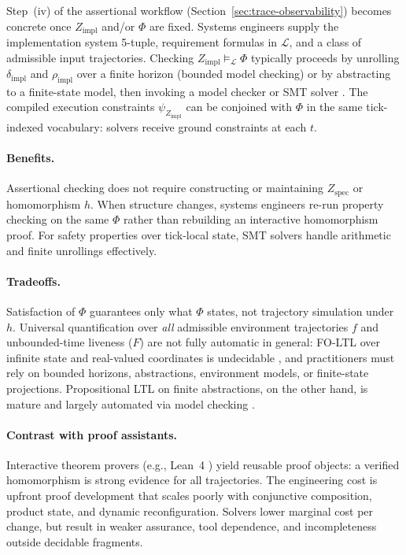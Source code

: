 Step~(iv) of the assertional workflow (Section~\ref{sec:trace-observability}) becomes concrete once $Z_{\text{impl}}$ and/or $\Phi$ are fixed. Systems engineers supply the implementation system 5-tuple, requirement formulas in $\mathcal{L}$, and a class of admissible input trajectories. Checking $Z_{\text{impl}} \models_{\mathcal{L}} \Phi$ typically proceeds by unrolling $\delta_{\text{impl}}$ and $\rho_{\text{impl}}$ over a finite horizon (bounded model checking) or by abstracting to a finite-state model, then invoking a model checker or SMT solver \parencite{BaierKatoen2008,deMouraZ32008}. The compiled execution constraints $\psi_{Z_{\text{impl}}}$ can be conjoined with $\Phi$ in the same tick-indexed vocabulary: solvers receive ground constraints at each $t$.

\paragraph{Benefits.} Assertional checking does not require constructing or maintaining $Z_{\text{spec}}$ or homomorphism $h$. When structure changes, systems engineers re-run property checking on the same $\Phi$ rather than rebuilding an interactive homomorphism proof. For safety properties over tick-local state, SMT solvers handle arithmetic and finite unrollings effectively.

\paragraph{Tradeoffs.} Satisfaction of $\Phi$ guarantees only what $\Phi$ states, not trajectory simulation under $h$. Universal quantification over \emph{all} admissible environment trajectories $f$ and unbounded-time liveness ($F$) are not fully automatic in general: FO-LTL over infinite state and real-valued coordinates is undecidable \parencite{BaierKatoen2008}, and practitioners must rely on bounded horizons, abstractions, environment models, or finite-state projections. Propositional LTL on finite abstractions, on the other hand, is mature and largely automated via model checking \parencite{BaierKatoen2008}.

\paragraph{Contrast with proof assistants.} Interactive theorem provers (e.g., Lean~4 \parencite{demoura21lean4}) yield reusable proof objects: a verified homomorphism is strong evidence for all trajectories. The engineering cost is upfront proof development that scales poorly with conjunctive composition, product state, and dynamic reconfiguration. Solvers lower marginal cost per change, but result in weaker assurance, tool dependence, and incompleteness outside decidable fragments.

